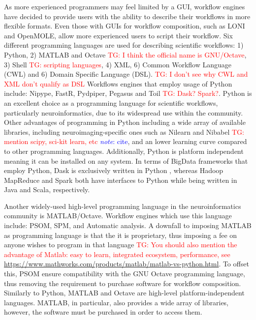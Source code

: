 \documentclass{report}
\newcommand{\note}[1]{\textcolor{blue}{\textit{note}: #1}}
\newcommand{\tristan}[1]{\textcolor{red}{TG: #1}}
\begin{document}
            As more experienced programmers may feel limited by a GUI, workflow
            engines have decided to provide users with the ability to describe
            their workflows in more flexible formats. Even those with GUIs for 
            workflow composition, such as LONI and OpenMOLE, allow more 
            experienced users to script their workflow. Six different 
            programming
            languages are used for describing scientific workflows: 1) Python, 
            2) MATLAB and Octave \tristan{I think the official name is GNU/Octave}, 3) Shell \tristan{scripting languages}, 4) XML, 6) Common Workflow Language 
            (CWL) and 6) Domain Specific Language (DSL). \tristan{I don't see why CWL and XML don't qualify as DSL} Workflows engines that 
            employ usage of Python include: Nipype, FastR, Pydpiper, Pegasus
            and Toil \tristan{Dask? Spark?}.
            Python is an excellent choice as a programming language for 
            scientific workflows, particularly neuroinformatics, due to its 
            widespread use within the community. Other advantages of 
            programming in Python including a wide array of available libraries,
            including neuroimaging-specific ones such as Nilearn and Nibabel \tristan{mention scipy, sci-kit learn, etc}
            \note{cite}, and an lower learning curve compared to other 
            programming languages. Additionally, Python is platform independent
            meaning it can be installed on any system. In terms of BigData 
            frameworks that employ Python, Dask is exclusively written in Python
            , whereas Hadoop MapReduce and Spark both have interfaces to Python
            while being written in Java and Scala, respectively.

            Another widely-used high-level programming language in the 
            neuroinformatics community is MATLAB/Octave. Workflow engines which
            use this language include: PSOM, SPM, and Automatic analysis. A 
            downfall to imposing MATLAB as programming language is that the 
            it is proprietary, thus imposing a fee on 
            anyone wishes to program in that language \tristan{You should also mention the
            advantage of Matlab: easy to learn, integrated ecosystem, 
            performance, see 
            \url{https://www.mathworks.com/products/matlab/matlab-vs-python.html}}. 
            To offset this, PSOM ensure compatibility with the GNU 
            Octave programming language, thus 
            removing the requirement to purchase software for workflow 
            composition. Similarly to Python, MATLAB and Octave are 
            high-level platform-independent languages. MATLAB, in particular,
            also provides a wide array of libraries, however, the software must
            be purchased in order to access them.
\end{document}
